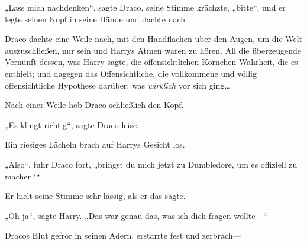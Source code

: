 „Lass mich nachdenken“, sagte Draco, seine Stimme krächzte, „bitte“, und er legte seinen Kopf in seine Hände und dachte nach.

\later

Draco dachte eine Weile nach, mit den Handflächen über den Augen, um die Welt auszuschließen, nur sein und Harrys Atmen waren zu hören. All die überzeugende Vernunft dessen, was Harry sagte, die offensichtlichen Körnchen Wahrheit, die es enthielt; und dagegen das Offensichtliche, die vollkommene und völlig offensichtliche Hypothese darüber, was \emph{wirklich} vor sich ging…

Nach einer Weile hob Draco schließlich den Kopf.

„Es klingt richtig“, sagte Draco leise.

Ein riesiges Lächeln brach auf Harrys Gesicht los.

„Also“, fuhr Draco fort, „bringst du mich jetzt zu Dumbledore, um es offiziell zu machen?“

Er hielt seine Stimme sehr lässig, als er das sagte.

„Oh ja“, sagte Harry. „Das war genau das, was ich dich fragen wollte—“

Dracos Blut gefror in seinen Adern, erstarrte fest und zerbrach—

